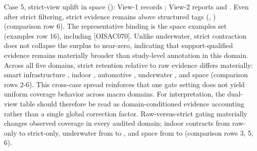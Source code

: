 {}Case 5, strict-view uplift in space (): View-1 records ; View-2 reports  and . Even after strict filtering, strict evidence remains above structured tags (, ) (comparison row \markdownRendererHash{}6). The representative binding is the space  examples set (examples row \markdownRendererHash{}16), including  [O\markdownRendererUnderscore{}ISAC\markdownRendererUnderscore{}070]. Unlike underwater, strict contraction does not collapse the surplus to near-zero, indicating that support-qualified evidence remains materially broader than study-level annotation in this domain.\markdownRendererParagraphSeparator
{}Across all five domains, strict retention relative to raw evidence differs materially: smart infrastructure , indoor , automotive , underwater , and space  (comparison rows \markdownRendererHash{}2-\markdownRendererHash{}6). This cross-case spread reinforces that one gate setting does not yield uniform coverage behavior across macro domains. For interpretation, the dual-view table should therefore be read as domain-conditioned evidence accounting rather than a single global correction factor.\markdownRendererParagraphSeparator
{}\markdownRendererInterblockSeparator
{}\markdownRendererUlBeginTight
\markdownRendererUlItem Raw-versus-strict gating materially changes observed coverage in every audited domain; indoor contracts from  raw-only to  strict-only, underwater from  to , and space from  to  (comparison rows \markdownRendererHash{}3, \markdownRendererHash{}5, \markdownRendererHash{}6).\markdownRendererUlItemEnd 
